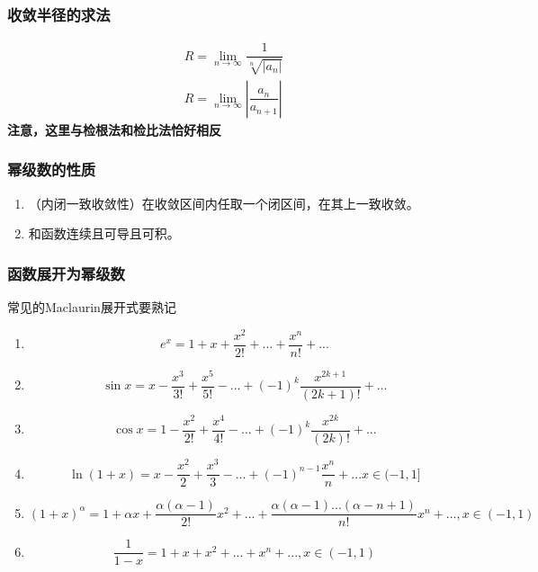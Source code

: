 \subsubsection{收敛半径的求法}
\begin{align}
	R=\lim_{n \rightarrow \infty}\dfrac{1}{\sqrt[n]{|a_n|}}\\
	R=\lim_{n \rightarrow \infty}|\dfrac{a_n}{a_{n+1}}|
\end{align}
\textbf{注意，这里与检根法和检比法恰好相反}
\subsubsection{幂级数的性质}
\begin{enumerate}
	\item （内闭一致收敛性）在收敛区间内任取一个闭区间，在其上一致收敛。
	\item 和函数连续且可导且可积。
\end{enumerate}
\subsubsection{函数展开为幂级数}
常见的Maclaurin展开式要熟记
\begin{enumerate}
	\item \begin{equation}\label{key}
		e^x=1+x+\dfrac{x^2}{2!}+...+\dfrac{x^n}{n!}+...
	\end{equation}
	\item \begin{equation}\label{key}
		\sin x=x- \dfrac{x^3}{3!}+\dfrac{x^5}{5!}-...+(-1)^k\dfrac{x^{2k+1}}{(2k+1)!}+...
	\end{equation}
	\item \begin{equation}\label{key}
		\cos x= 1-\dfrac{x^2}{2!}+\dfrac{x^4}{4!}-...+(-1)^k\dfrac{x^{2k}}{(2k)!}+...
	\end{equation}
	\item \begin{equation}\label{key}
		\ln (1+x)= x-\dfrac{x^2}{2}+\dfrac{x^3}{3}-...+(-1)^{n-1}\dfrac{x^n}{n}+... x \in (-1,1]
	\end{equation}
	\item \begin{equation}\label{key}
		(1+x)^\alpha=1+\alpha x + \dfrac{\alpha(\alpha -1)}{2!}x^2+...+\dfrac{\alpha(\alpha -1)...(\alpha-n+1)}{n!}x^n+...,x \in (-1,1)
	\end{equation}
	\item \begin{equation}\label{key}
		\dfrac{1}{1-x}=1+x+x^2+...+x^n+...,x\in (-1,1)
	\end{equation}
\end{enumerate}

